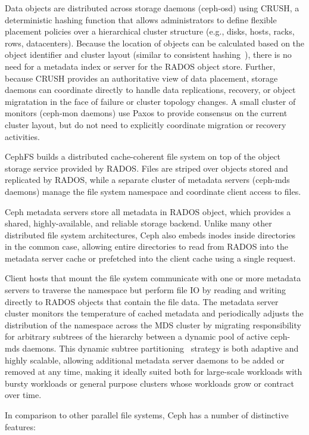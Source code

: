 Data objects are distributed across storage daemons (ceph-osd) using
CRUSH\cite{crush}, a deterministic hashing function that allows administrators
to define flexible placement policies over a hierarchical cluster structure
(e.g., disks, hosts, racks, rows, datacenters).  Because the location of
objects can be calculated based on the object identifier and cluster layout
(similar to consistent hashing~\cite{..}), there is no need for a metadata
index or server for the RADOS object store. Further, because CRUSH provides an
authoritative view of data placement, storage daemons can coordinate directly
to handle data replications, recovery, or object migratation in the face of
failure or cluster topology changes.  A small cluster of monitors (ceph-mon
daemons) use Paxos to provide consensus on the current cluster layout, but do
not need to explicitly coordinate migration or recovery activities.

CephFS builds a distributed cache-coherent file system on top of the object
storage service provided by RADOS.  Files are striped over objects stored and
replicated by RADOS, while a separate cluster of metadata servers (ceph-mds
daemons) manage the file system namespace and coordinate client access to
files.  

Ceph metadata servers store all metadata in RADOS object, which provides a
shared, highly-available, and reliable storage backend.  Unlike many other
distributed file system architectures, Ceph also embeds inodes inside
directories in the common case, allowing entire directories to read from RADOS
into the metadata server cache or prefetched into the client cache using a
single request.

Client hosts that mount the file system communicate with one or more metadata
servers to traverse the namespace but perform file IO by reading and writing
directly to RADOS objects that contain the file data.  The metadata server
cluster monitors the temperature of cached metadata and periodically adjusts
the distribution of the namespace across the MDS cluster by migrating
responsibility for arbitrary subtrees of the hierarchy between a dynamic pool
of active ceph-mds daemons.  This dynamic subtree partitioning~\cite{..}
strategy is both adaptive and highly scalable, allowing additional metadata
server daemons to be added or removed at any time, making it ideally suited
both for large-scale workloads with bursty workloads or general purpose
clusters whose workloads grow or contract over time.

In comparison to other parallel file
systems, Ceph has a number of distinctive features:

